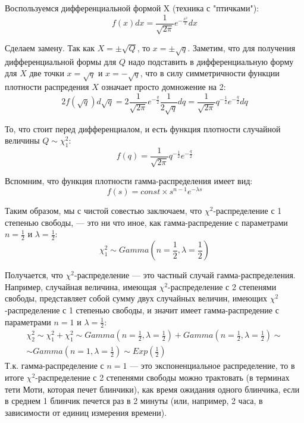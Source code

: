 \documentclass[12pt]{article} %
\theoremstyle{definition} %
\def \cChi{\mathcal{\chi}}
\begin{document}
Воспользуемся дифференциальной формой X (техника с "птичками"):
    \[
        f(x)dx=\frac{1}{\sqrt{2\pi}}e^{-\frac{x^2}{2}}dx
    \]

Сделаем замену. Так как $X=\pm \sqrt{Q}$, то $x=\pm \sqrt{q}$. Заметим, что для получения дифференциальной формы для $Q$ надо подставить в дифференциальную форму для $X$ две точки $x= \sqrt{q}$ и $x=- \sqrt{q}$, что в силу симметричности функции плотности распредения $X$ означает просто домножение на 2:
    \[
        2f(\sqrt{q})d\sqrt{q} = 2 \frac{1}{\sqrt{2\pi}} e^{-\frac{q}{2}} \frac{1}{2 \sqrt{q}} dq = \frac{1}{\sqrt{2\pi}} q^{-\frac{1}{2}} e^{-\frac{q}{2}} dq
    \]

То, что стоит перед дифференциалом, и есть функция плотности случайной величины $Q \sim \cChi_1^2$:
    \[
         f(q) = \frac{1}{\sqrt{2\pi}} q^{-\frac{1}{2}} e^{-\frac{q}{2}}
    \]

Вспомним, что функция плотности гамма-распределения имеет вид:
    \[
         f(s) = const \times s^{n-1} e^{-\lambda s}
    \]

Таким образом, мы с чистой совестью заключаем, что $\chi^2$-распределение с 1 степенью свободы, --- это ни что иное, как гамма-распредение с параметрами $n=\frac{1}{2}$ и $\lambda=\frac{1}{2}$:
    \[
        \cChi_1^2 \sim Gamma\left(n=\frac{1}{2}, \lambda=\frac{1}{2}\right)
    \]

Получается, что $\chi^2$-распределение --- это частный случай гамма-распределения. Например, случайная величина, имеющая $\chi^2$-распределение с 2 степенями свободы, представляет собой сумму двух случайных величин, имеющих $\chi^2$-распределение с 1 степенью свободы, и значит имеет гамма-распредение с параметрами $n=1$ и $\lambda=\frac{1}{2}$:
    \begin{eqnarray*}
        \cChi_2^2 \sim \cChi_1^2 + \cChi_1^2 \sim
        Gamma\left(n=\frac{1}{2}, \lambda=\frac{1}{2}\right) +
        Gamma\left(n=\frac{1}{2}, \lambda=\frac{1}{2}\right) \sim \\
        \sim Gamma\left(n=1, \lambda=\frac{1}{2}\right) \sim
        Exp\left(\frac{1}{2}\right)
    \end{eqnarray*}
Т.к. гамма-распределение с $n=1$ --- это экспоненциальное распределение, то в итоге $\chi^2$-распределение с 2 степенями свободы можно трактовать (в терминах тети Моти, которая печет блинчики), как время ожидания одного блинчика, если в среднем 1 блинчик печется раз в 2 минуты (или, например, 2 часа, в зависимости от единиц измерения времени).

\end{document}
